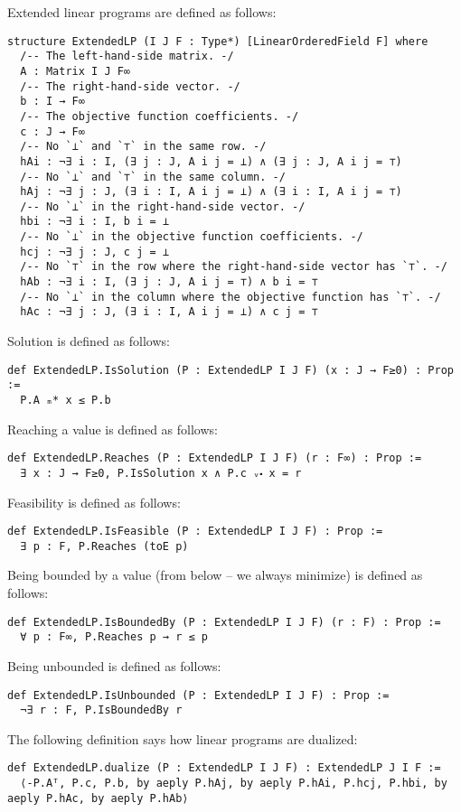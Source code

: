 \documentclass[]{article}
\renewcommand{\.}{\hskip .75pt}
\begin{document}
Extended linear programs are defined as follows:
\begin{lstlisting}
structure ExtendedLP (I J F : Type*) [LinearOrderedField F] where
  /-- The left-hand-side matrix. -/
  A : Matrix I J F∞
  /-- The right-hand-side vector. -/
  b : I → F∞
  /-- The objective function coefficients. -/
  c : J → F∞
  /-- No `⊥` and `⊤` in the same row. -/
  hAi : ¬∃ i : I, (∃ j : J, A i j = ⊥) ∧ (∃ j : J, A i j = ⊤)
  /-- No `⊥` and `⊤` in the same column. -/
  hAj : ¬∃ j : J, (∃ i : I, A i j = ⊥) ∧ (∃ i : I, A i j = ⊤)
  /-- No `⊥` in the right-hand-side vector. -/
  hbi : ¬∃ i : I, b i = ⊥
  /-- No `⊥` in the objective function coefficients. -/
  hcj : ¬∃ j : J, c j = ⊥
  /-- No `⊤` in the row where the right-hand-side vector has `⊤`. -/
  hAb : ¬∃ i : I, (∃ j : J, A i j = ⊤) ∧ b i = ⊤
  /-- No `⊥` in the column where the objective function has `⊤`. -/
  hAc : ¬∃ j : J, (∃ i : I, A i j = ⊥) ∧ c j = ⊤
\end{lstlisting}
Solution is defined as follows:
\begin{lstlisting}
def ExtendedLP.IsSolution (P : ExtendedLP I J F) (x : J → F≥0) : Prop :=
  P.A ₘ* x ≤ P.b
\end{lstlisting}
Reaching a value is defined as follows:
\begin{lstlisting}
def ExtendedLP.Reaches (P : ExtendedLP I J F) (r : F∞) : Prop :=
  ∃ x : J → F≥0, P.IsSolution x ∧ P.c ᵥ⬝ x = r
\end{lstlisting}
Feasibility is defined as follows:
\begin{lstlisting}
def ExtendedLP.IsFeasible (P : ExtendedLP I J F) : Prop :=
  ∃ p : F, P.Reaches (toE p)
\end{lstlisting}
Being bounded by a value (from below -- we always minimize) is defined as follows:
\begin{lstlisting}
def ExtendedLP.IsBoundedBy (P : ExtendedLP I J F) (r : F) : Prop :=
  ∀ p : F∞, P.Reaches p → r ≤ p
\end{lstlisting}
Being unbounded is defined as follows:
\begin{lstlisting}
def ExtendedLP.IsUnbounded (P : ExtendedLP I J F) : Prop :=
  ¬∃ r : F, P.IsBoundedBy r
\end{lstlisting}
The following definition says how linear programs are dualized:
\begin{lstlisting}
def ExtendedLP.dualize (P : ExtendedLP I J F) : ExtendedLP J I F :=
  ⟨-P.Aᵀ, P.c, P.b, by aeply P.hAj, by aeply P.hAi, P.hcj, P.hbi, by aeply P.hAc, by aeply P.hAb⟩
\end{lstlisting}
\end{document}
